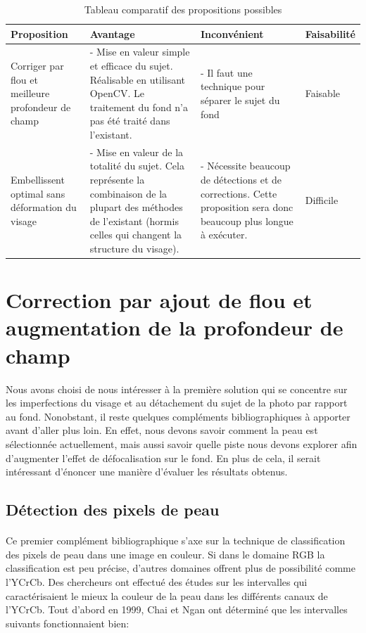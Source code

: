 \documentclass[11pt, french,screen]{report-rd-info}
\begin{document}
\begin{table}
\begin{center}
\begin{tabular}{|p{3cm}|p{4cm}|p{4cm}|p{2.5cm}|}
\hline
Proposition & Avantage & Inconvénient & Faisabilité \\ \hline
Corriger par flou et meilleure profondeur de champ & - Mise en valeur simple et efficace du sujet. Réalisable en utilisant OpenCV. Le traitement du fond n'a pas été traité dans l'existant. & - Il faut une technique pour séparer le sujet du fond & Faisable \\ \hline
Embellissent optimal sans déformation du visage & - Mise en valeur de la totalité du sujet. Cela représente la combinaison de la plupart des méthodes de l'existant (hormis celles qui changent la structure du visage). & - Nécessite beaucoup de détections et de corrections. Cette proposition sera donc beaucoup plus longue à exécuter. & Difficile \\ \hline
\end{tabular}
\end{center}
\caption{Tableau comparatif des propositions possibles}
\label{tab:compprop}
\end{table}






\section{Correction par ajout de flou et augmentation de la profondeur de champ}
Nous avons choisi de nous intéresser à la première solution qui se concentre sur les imperfections du visage et au détachement du sujet de la photo par rapport au fond. Nonobstant, il reste quelques compléments bibliographiques à apporter avant d'aller plus loin. En effet, nous devons savoir comment la peau est sélectionnée actuellement, mais aussi savoir quelle piste nous devons explorer afin d'augmenter l'effet de défocalisation sur le fond. En plus de cela, il serait intéressant d'énoncer une manière d'évaluer les résultats obtenus.


\subsection{Détection des pixels de peau}
\label{part:detectionpeau}
\paragraph*{}
Ce premier complément bibliographique s'axe sur la technique de classification des pixels de peau dans une image en couleur. Si dans le domaine RGB la classification est peu précise, d'autres domaines offrent plus de possibilité comme l’YCrCb. Des chercheurs ont effectué des études sur les intervalles qui caractérisaient le mieux la couleur de la peau dans les différents canaux de l'YCrCb. Tout d'abord en 1999, Chai et Ngan \cite{Chai1999} ont déterminé que les intervalles suivants fonctionnaient bien: 
\end{document}
